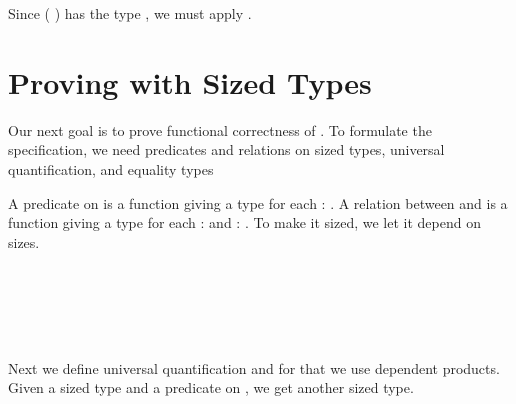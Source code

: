 Since  ( ) has the type , we must apply .

\section{Proving with Sized Types}
Our next goal is to prove functional correctness of .
To formulate the specification, we need predicates and relations on sized types, universal quantification, and equality types

A predicate on  is a function giving a type for each  : .
A relation between  and  is a function giving a type for each  :  and  : .
To make it sized, we let it depend on sizes.

\begin{code}%
\>[0]\AgdaSpace{}%
\AgdaSymbol{:}\AgdaSpace{}%
\AgdaSpace{}%
\AgdaSpace{}%
\<%
\\
\>[0]\AgdaSpace{}%
\AgdaSpace{}%
\AgdaSymbol{=}\AgdaSpace{}%
\AgdaSymbol{\{}\AgdaSpace{}%
\AgdaSymbol{:}\AgdaSpace{}%
\AgdaSymbol{\}}\AgdaSpace{}%
\AgdaSpace{}%
\AgdaSpace{}%
\AgdaSpace{}%
\AgdaSpace{}%
\<%
\\
%
\\[\AgdaEmptyExtraSkip]%
\>[0]\AgdaSpace{}%
\AgdaSymbol{:}\AgdaSpace{}%
\AgdaSpace{}%
\AgdaSpace{}%
\AgdaSpace{}%
\AgdaSpace{}%
\<%
\\
\>[0]\AgdaSpace{}%
\AgdaSpace{}%
\AgdaSpace{}%
\AgdaSymbol{=}\AgdaSpace{}%
\AgdaSymbol{\{}\AgdaSpace{}%
\AgdaSymbol{:}\AgdaSpace{}%
\AgdaSymbol{\}}\AgdaSpace{}%
\AgdaSpace{}%
\AgdaSpace{}%
\AgdaSpace{}%
\AgdaSpace{}%
\AgdaSpace{}%
\AgdaSpace{}%
\AgdaSpace{}%
\<%
\end{code}

Next we define universal quantification and for that we use dependent products.
Given a sized type  and a predicate on , we get another sized type.

